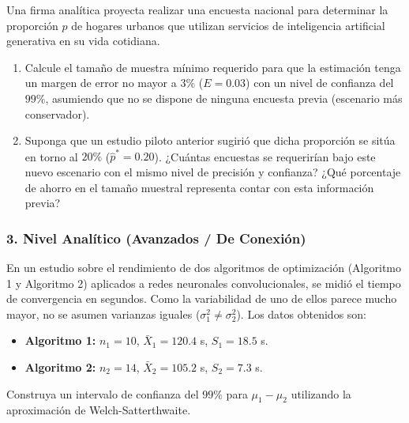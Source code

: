 \begin{problema}
	\label{prob:n_proporcion}
	Una firma analítica proyecta realizar una encuesta nacional para determinar la proporción $p$ de hogares urbanos que utilizan servicios de inteligencia artificial generativa en su vida cotidiana.
	\begin{enumerate}
		\item Calcule el tamaño de muestra mínimo requerido para que la estimación tenga un margen de error no mayor a $3\%$ ($E = 0.03$) con un nivel de confianza del $99\%$, asumiendo que no se dispone de ninguna encuesta previa (escenario más conservador).
		\item Suponga que un estudio piloto anterior sugirió que dicha proporción se sitúa en torno al $20\%$ ($\hat{p}^* = 0.20$). ¿Cuántas encuestas se requerirían bajo este nuevo escenario con el mismo nivel de precisión y confianza? ¿Qué porcentaje de ahorro en el tamaño muestral representa contar con esta información previa?
	\end{enumerate}
\end{problema}

\subsubsection*{3. Nivel Analítico (Avanzados / De Conexión)}

\begin{problema}
	\label{prob:dif_medias_welch}
	En un estudio sobre el rendimiento de dos algoritmos de optimización (Algoritmo 1 y Algoritmo 2) aplicados a redes neuronales convolucionales, se midió el tiempo de convergencia en segundos. Como la variabilidad de uno de ellos parece mucho mayor, no se asumen varianzas iguales ($\sigma_1^2 \neq \sigma_2^2$). Los datos obtenidos son:
	\begin{itemize}
		\item \textbf{Algoritmo 1:} $n_1 = 10$, $\bar{X}_1 = 120.4$ s, $S_1 = 18.5$ s.
		\item \textbf{Algoritmo 2:} $n_2 = 14$, $\bar{X}_2 = 105.2$ s, $S_2 = 7.3$ s.
	\end{itemize}
	Construya un intervalo de confianza del $99\%$ para $\mu_1 - \mu_2$ utilizando la aproximación de Welch-Satterthwaite.
\end{problema}

